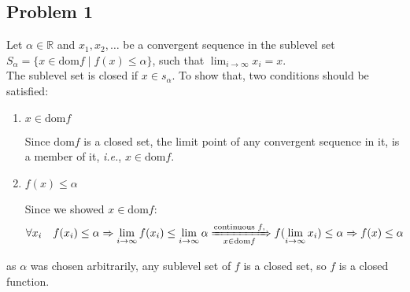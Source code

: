 \documentclass[12pt, letterpaper, twoside]{article}
\newcommand{\R}{\mathbb{R}}
\begin{document}
\subsection*{Problem 1}
Let $\alpha\in\R$ and $x_1, x_2, \dots$ be a convergent sequence in the sublevel set $S_{\alpha}=\{x\in\mathrm{dom}f\mid f(x)\leq\alpha\}$, such that $\lim_{i\rightarrow\infty} x_i=x$.\\
The sublevel set is closed if $x\in s_{\alpha}$. To show that, two conditions should be satisfied:
\begin{enumerate}

    \item \underline{$x\in\mathrm{dom} f$}
    
    Since $\mathrm{dom}f$ is a closed set, the limit point of any convergent sequence in it, is a member of it, \emph{i.e.}, $x\in\mathrm{dom} f$.
    
    \item \underline{$f(x)\leq\alpha$}
    
    Since we showed $x\in\mathrm{dom}f$:
    \begin{align*}
        \forall x_i \quad f(x_i)\leq\alpha\Rightarrow \lim_{i\rightarrow\infty}f(x_i)\leq\lim_{i\rightarrow\infty}\alpha\xRightarrow[x\in\mathrm{dom}f]{\text{continuous } f,}f(\lim_{i\rightarrow\infty} x_i)\leq\alpha\Rightarrow f(x)\leq\alpha
    \end{align*}
    
\end{enumerate}
as $\alpha$ was chosen arbitrarily, any sublevel set of $f$ is a closed set, so $f$ is a closed function.\\
\clearpage
\end{document}
